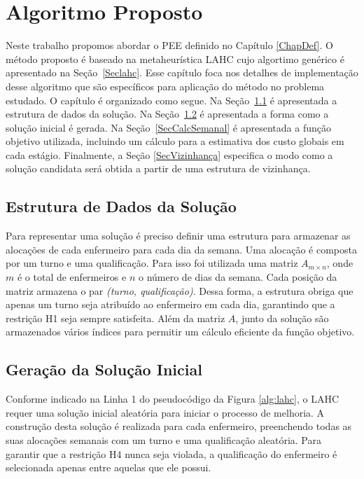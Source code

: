\documentclass[cic,tc, twoside]{iiufrgs}
\begin{document}
\chapter{Algoritmo Proposto} \label{ChapLAHC}

Neste trabalho propomos abordar o PEE definido no Capítulo \ref{ChapDef}. 
O método proposto é baseado na metaheurística LAHC cujo algortimo genérico é apresentado na Seção~\ref{Seclahc}.
Esse capítulo foca nos detalhes de implementação desse algoritmo que são específicos para aplicação do método no problema estudado. 
O capítulo é organizado como segue. Na Seção~\ref{SecEstruturaSol} é apresentada a estrutura de dados da solução.
Na Seção~\ref{SecGeracaoSol} é apresentada a forma como a solução inicial é gerada. 
Na Seção~\ref{SecCalcSemanal} é apresentada a função objetivo utilizada, incluindo um cálculo para a estimativa dos custo globais em cada estágio. 
Finalmente, a Seção \ref{SecVizinhança} especifica o modo como a solução candidata será obtida a partir de uma estrutura de vizinhança.


\section{Estrutura de Dados da Solução}\label{SecEstruturaSol}

Para representar uma solução é preciso definir uma estrutura para armazenar as alocações de cada enfermeiro para cada dia da semana.
Uma alocação é composta por um turno e uma qualificação. Para isso foi utilizada uma matriz $A_{m \times n}$, onde $m$ é o total de enfermeiros e $n$ o número de dias da semana. Cada posição da matriz armazena o par \emph{(turno, qualificação)}. Dessa forma, a estrutura obriga que apenas um turno seja atribuído ao enfermeiro em cada dia, garantindo que a restrição H1 seja sempre satisfeita.
Além da matriz $A$, junto da solução são armazenados vários índices para permitir um cálculo eficiente da função objetivo.

\section{Geração da Solução Inicial}\label{SecGeracaoSol}

Conforme indicado na Linha 1 do pseudocódigo da Figura \ref{alg:lahc}, o LAHC requer uma solução inicial aleatória para iniciar o processo de melhoria.
A construção desta solução é realizada para cada enfermeiro, preenchendo todas as suas alocações semanais com um turno e uma qualificação aleatória.
Para garantir que a restrição H4 nunca seja violada, a qualificação do enfermeiro é selecionada apenas entre aquelas que ele possui. 
\end{document}
